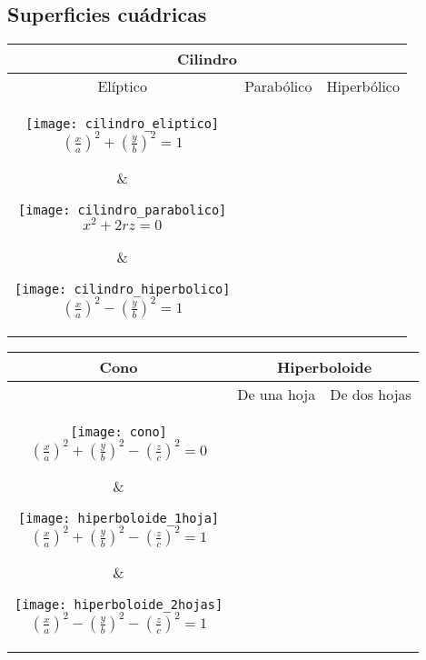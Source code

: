 \documentclass[a4paper, twoside]{article}
\numberwithin{equation}{section}
\numberwithin{figure}{section}
\numberwithin{table}{section}
\begin{document}
\subsection{Superficies cuádricas}
\begin{center}
	\begin{tabular}{c c c}
		\multicolumn{3}{c}{\textbf{Cilindro}} \\ 
		\toprule
		Elíptico & Parabólico & Hiperbólico \\ 
		\parbox{5cm}{
			\begin{center}
				\texttt{[image: cilindro\_eliptico]} \\
				$\left(\frac{x}{a}\right)^2+\left(\frac{y}{b}\right)^2=1$
			\end{center}} &
		\parbox{5cm}{
			\begin{center}
				\texttt{[image: cilindro\_parabolico]} \\
				$x^2+2rz=0$\end{center}} &
		\parbox{5cm}{
			\begin{center}
				\texttt{[image: cilindro\_hiperbolico]} \\
				$\left(\frac{x}{a}\right)^2-\left(\frac{y}{b}\right)^2=1$
			\end{center}} \\
	\end{tabular}

	\begin{tabular}{c | c c}
		\textbf{Cono} & \multicolumn{2}{c}{\textbf{Hiperboloide}} \\ 
		\hline
		 & De una hoja & De dos hojas \\ 
		\parbox{5cm}{
			\begin{center}
				\texttt{[image: cono]}\\
				$\left(\frac{x}{a}\right)^2+\left(\frac{y}{b}\right)^2-\left(\frac{z}{c}\right)^2=0$
			\end{center}} &
		\parbox{5cm}{
			\begin{center}
				\texttt{[image: hiperboloide\_1hoja]} \\
				$\left(\frac{x}{a}\right)^2+\left(\frac{y}{b}\right)^2-\left(\frac{z}{c}\right)^2=1$
			\end{center}} &
		\parbox{5cm}{
			\begin{center}
				\texttt{[image: hiperboloide\_2hojas]} \\
				$\left(\frac{x}{a}\right)^2-\left(\frac{y}{b}\right)^2-\left(\frac{z}{c}\right)^2=1$
			\end{center}} \\
	\end{tabular}	


\end{center}
\end{document}
